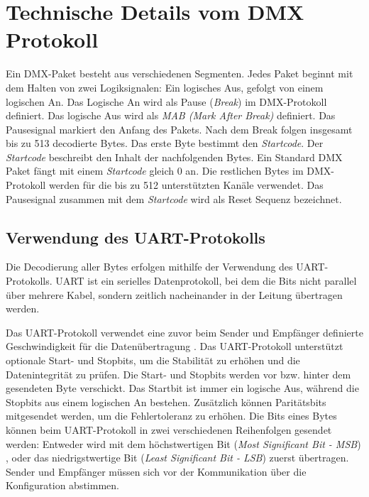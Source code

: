 \chapter{Technische Details vom DMX Protokoll}

Ein DMX-Paket besteht aus verschiedenen Segmenten. Jedes Paket beginnt mit dem Halten von zwei Logiksignalen: Ein logisches Aus, gefolgt von einem logischen An. Das Logische An wird als Pause (\emph{Break}) im DMX-Protokoll definiert. Das logische Aus wird als \emph{MAB (Mark After Break)} definiert. Das Pausesignal markiert den Anfang des Pakets. Nach dem Break folgen insgesamt bis zu 513 decodierte Bytes. Das erste Byte bestimmt den \emph{Startcode}. Der \emph{Startcode} beschreibt den Inhalt der nachfolgenden Bytes. Ein Standard DMX Paket fängt mit einem \emph{Startcode} gleich 0 an. Die restlichen Bytes im DMX-Protokoll werden für die bis zu 512 unterstützten Kanäle verwendet\cite[S.14]{DMX512-Protocol-Standard}. Das Pausesignal zusammen mit dem \emph{Startcode} wird als Reset Sequenz bezeichnet\cite[S.17]{DMX512-Protocol-Standard}.

\section{Verwendung des UART-Protokolls}

Die Decodierung aller Bytes erfolgen mithilfe der Verwendung des UART-Protokolls. UART ist ein serielles Datenprotokoll, bei dem die Bits nicht parallel über mehrere Kabel, sondern zeitlich nacheinander in der Leitung übertragen werden.

Das UART-Protokoll verwendet eine zuvor beim Sender und Empfänger definierte Geschwindigkeit für die Datenübertragung \cite[S.2]{UartStandard}.  Das UART-Protokoll unterstützt optionale Start- und Stopbits, um die Stabilität zu erhöhen und die Datenintegrität zu prüfen\cite[S.2]{UartStandard}. Die Start- und Stopbits werden vor bzw. hinter dem gesendeten Byte verschickt. Das Startbit ist immer ein logische Aus, während die Stopbits aus einem logischen An bestehen\cite[S.2]{UartStandard}. Zusätzlich können Paritätsbits mitgesendet werden, um die Fehlertoleranz zu erhöhen\cite[S.2]{UartStandard}. Die Bits eines Bytes können beim UART-Protokoll in zwei verschiedenen Reihenfolgen gesendet werden: Entweder wird mit dem
höchstwertigen Bit (\emph{Most Significant Bit - MSB}) , oder das niedrigstwertige Bit (\emph{Least Significant Bit - LSB}) zuerst übertragen\cite[S.2]{UartStandard}. Sender und Empfänger müssen sich vor der Kommunikation über die Konfiguration abstimmen.

